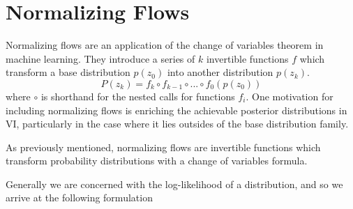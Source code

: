 


\section{Normalizing Flows}

Normalizing flows are an application of the change of variables theorem in machine learning. They introduce a series of  $k$ invertible functions $f$ which transform a base distribution $p(z_{0})$ into another distribution $p(z_{k})$. 
\begin{equation}
P(z_{k}) = f_{k} \circ f_{k-1} \circ ... \circ f_{0}(p(z_{0}))
\end{equation} 
where $\circ$ is shorthand for the nested calls for functions $f_{i}$. One motivation for including normalizing flows is enriching the achievable posterior distributions in \ac{VI}, particularly in the case where it lies outsides of the base distribution family. 

As previously mentioned, normalizing flows are invertible functions which transform probability distributions with a change of variables formula.

 Generally we are concerned with the log-likelihood of a distribution, and so we arrive at the following formulation



